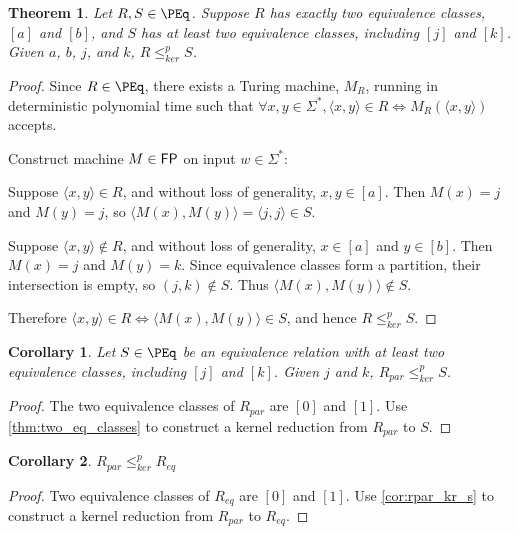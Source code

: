 \documentclass{article}
\newtheorem{theorem}{Theorem}[section]
\newtheorem{corollary}[corollary]{Corollary}
\theoremstyle{definition} \newtheorem{definition}[definition]{Definition}
\newcommand{\sigmastar}{\Sigma^{*}} %
\newcommand{\kr}{\leq^{p}_{ker}} %
\newcommand{\pair}[2]{\langle#1,#2\rangle} %
\begin{document}
\begin{theorem}\label{thm:two_eq_classes}
  Let $R,S\in\PEq$. Suppose $R$ has exactly two equivalence classes, $[a]$ and
  $[b]$, and $S$ has at least two equivalence classes, including $[j]$ and
  $[k]$. Given $a$, $b$, $j$, and $k$, $R\kr S$.
\end{theorem}
\begin{proof}
  Since $R\in\PEq$, there exists a Turing machine, $M_R$, running in
  deterministic polynomial time such that $\forall x,y\in\sigmastar,
  \pair{x}{y}\in R\iff M_R(\pair{x}{y})$ accepts.

  Construct machine $M\in{\ensuremath{\mathsf{FP}}}$ on input $w\in\sigmastar$:\\
  \begin{algorithm}[H]
    \eIf{$M_R(\pair{w}{a})$ accepts}{
      \Return{j}
    }{
      \Return{k}
    }
  \end{algorithm}

  Suppose $\pair{x}{y}\in R$, and without loss of generality, $x,y\in[a]$. Then
  $M(x)=j$ and $M(y)=j$, so $\pair{M(x)}{M(y)}=\pair{j}{j}\in S$.

  Suppose $\pair{x}{y}\notin R$, and without loss of generality, $x\in[a]$ and
  $y\in[b]$. Then $M(x)=j$ and $M(y)=k$. Since equivalence classes form a
  partition, their intersection is empty, so $(j,k)\notin S$. Thus
  $\pair{M(x)}{M(y)}\notin S$.

  Therefore $\pair{x}{y}\in R\iff \pair{M(x)}{M(y)}\in S$, and hence $R\kr S$.
\end{proof}

\begin{corollary}\label{cor:rpar_kr_s}
  Let $S\in\PEq$ be an equivalence relation with at least two equivalence
  classes, including $[j]$ and $[k]$. Given $j$ and $k$, $R_{par}\kr S$.
\end{corollary}
\begin{proof}
  The two equivalence classes of $R_{par}$ are $[0]$ and $[1]$. Use
  \autoref{thm:two_eq_classes} to construct a kernel reduction from $R_{par}$
  to $S$.
\end{proof}

\begin{corollary}
  $R_{par}\kr R_{eq}$
\end{corollary}
\begin{proof}
  Two equivalence classes of $R_{eq}$ are $[0]$ and $[1]$. Use
  \autoref{cor:rpar_kr_s} to construct a kernel reduction from $R_{par}$ to
  $R_{eq}$.
\end{proof}
\end{document}
